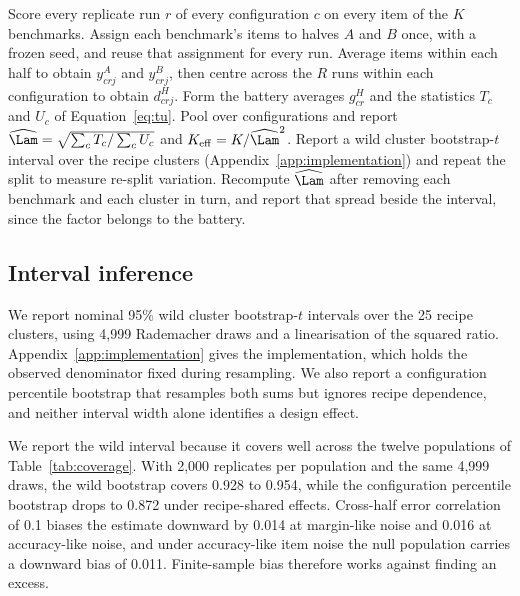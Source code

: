 \begin{algorithm}[t]
\caption{SNAP measurement recipe for a fixed battery of $K$ benchmarks scored on $R$ replicate runs per configuration. The primary analysis below used a random frozen split and checked a passage-aware split, and the registered test kept passage-linked items in one half.}
\label{alg:snap}
\begin{algorithmic}[1]
\STATE Score every replicate run $r$ of every configuration $c$ on every item of the $K$ benchmarks.
\STATE Assign each benchmark's items to halves $A$ and $B$ once, with a frozen seed, and reuse that assignment for every run.
\STATE Average items within each half to obtain $y^A_{crj}$ and $y^B_{crj}$, then centre across the $R$ runs within each configuration to obtain $d^H_{crj}$.
\STATE Form the battery averages $g^H_{cr}$ and the statistics $T_c$ and $U_c$ of Equation~\ref{eq:tu}.
\STATE Pool over configurations and report $\widehat\Lam=\sqrt{\sum_c T_c/\sum_c U_c}$ and $K_{\mathrm{eff}}=K/\widehat\Lam^2$.
\STATE Report a wild cluster bootstrap-$t$ interval over the recipe clusters (Appendix~\ref{app:implementation}) and repeat the split to measure re-split variation.
\STATE Recompute $\widehat\Lam$ after removing each benchmark and each cluster in turn, and report that spread beside the interval, since the factor belongs to the battery.
\end{algorithmic}
\end{algorithm}


\subsection{Interval inference}
We report nominal 95\% wild cluster bootstrap-$t$ intervals over the 25 recipe clusters, using 4,999 Rademacher draws and a linearisation of the squared ratio. Appendix~\ref{app:implementation} gives the implementation, which holds the observed denominator fixed during resampling. We also report a configuration percentile bootstrap that resamples both sums but ignores recipe dependence, and neither interval width alone identifies a design effect.

We report the wild interval because it covers well across the twelve populations of Table~\ref{tab:coverage}. With 2,000 replicates per population and the same 4,999 draws, the wild bootstrap covers 0.928 to 0.954, while the configuration percentile bootstrap drops to 0.872 under recipe-shared effects. Cross-half error correlation of 0.1 biases the estimate downward by 0.014 at margin-like noise and 0.016 at accuracy-like noise, and under accuracy-like item noise the null population carries a downward bias of 0.011. Finite-sample bias therefore works against finding an excess.

